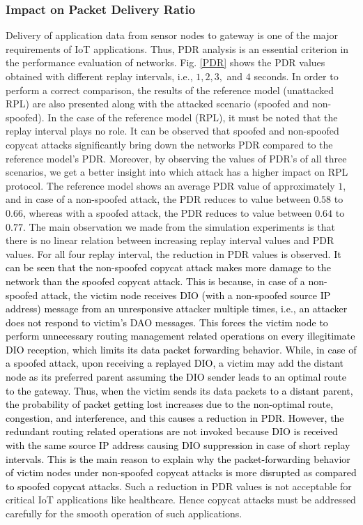 \documentclass[]{svjour3}                     %
\begin{document}
\subsubsection{Impact on Packet Delivery Ratio}\label{Impact on PDR}
Delivery of application data from sensor nodes to gateway is one of the major requirements of IoT applications. Thus, PDR analysis is an essential criterion in the performance evaluation of networks. Fig. \ref{PDR} shows the PDR values obtained with different replay intervals, i.e., $ 1, 2, 3,$ and $4 $ seconds. In order to perform a correct comparison, the results of the reference model (unattacked RPL) are also presented along with the attacked scenario (spoofed and non-spoofed). In the case of the reference model (RPL), it must be noted that the replay interval plays no role. It can be observed that spoofed and non-spoofed copycat attacks significantly bring down the networks PDR compared to the reference model's PDR. Moreover, by observing the values of PDR's of all three scenarios, we get a better insight into which attack has a higher impact on RPL protocol. The reference model shows an average PDR value of approximately $ 1 $, and in case of a non-spoofed attack, the PDR reduces to value between $ 0.58 $ to $ 0.66 $, whereas with a spoofed attack, the PDR reduces to value between $ 0.64 $ to $ 0.77 $. The main observation we made from the simulation experiments is that there is no linear relation between increasing replay interval values and PDR values. For all four replay interval, the reduction in PDR values is observed. \textcolor{black}{It can be seen that the non-spoofed copycat attack makes more damage to the network than the spoofed copycat attack. This is because, in case of a non-spoofed attack, the victim node receives DIO (with a non-spoofed source IP address) message from an unresponsive attacker multiple times, i.e., an attacker does not respond to victim's DAO messages. This forces the victim node to perform unnecessary routing management related operations on every illegitimate DIO reception, which limits its data packet forwarding behavior. While, in case of a spoofed attack, upon receiving a replayed DIO, a victim may add the distant node as its preferred parent assuming the DIO sender leads to an optimal route to the gateway. Thus, when the victim sends its data packets to a distant parent, the probability of packet getting lost increases due to the non-optimal route, congestion, and interference, and this causes a reduction in PDR. However, the redundant routing related operations are not invoked because DIO is received with the same source IP address causing DIO suppression in case of short replay intervals. This is the main reason to explain why the packet-forwarding behavior of victim nodes under non-spoofed copycat attacks is more disrupted as compared to spoofed copycat attacks.} Such a reduction in PDR values is not acceptable for critical IoT applications like healthcare. Hence copycat attacks must be addressed carefully for the smooth operation of such applications.
\end{document}
